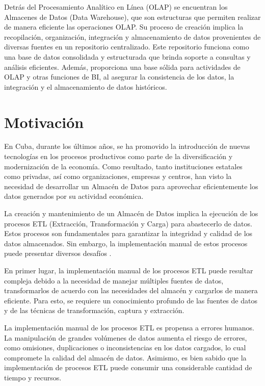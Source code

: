 Detrás del Procesamiento Analítico en Línea (OLAP) se encuentran los Almacenes de Datos (Data Warehouse), que son 
estructuras que permiten realizar de manera eficiente las operaciones OLAP. Su proceso de creaci\'on implica la 
recopilación, 
organización, integración y almacenamiento de datos provenientes de diversas fuentes en un repositorio centralizado. Este 
repositorio funciona como una base de datos consolidada y estructurada que brinda soporte a consultas y análisis eficientes. 
Además, proporciona una base sólida para actividades de OLAP y otras funciones de BI, al 
asegurar la consistencia de los datos, la integración y el almacenamiento de datos históricos.

\section{Motivaci\'on}

En Cuba, durante los \'ultimos años, se ha promovido la introducción de nuevas tecnologías en los procesos 
productivos como parte de la diversificación y modernización de la economía. Como resultado, tanto instituciones 
estatales como privadas, así como organizaciones, empresas y centros, han visto la necesidad de desarrollar un Almac\'en 
de Datos para aprovechar eficientemente los datos generados por su actividad económica.

La creación y mantenimiento de un Almacén de Datos implica la ejecución de los procesos ETL (Extracción, Transformación y 
Carga) para abastecerlo de datos. Estos procesos son fundamentales para garantizar la integridad y calidad de los datos 
almacenados. Sin embargo, la implementación manual de estos procesos puede presentar diversos desafíos
\cite{nwokeji2021systematic, dhaouadi2022data, kimball2004data}.

En primer lugar, la implementación manual de los procesos ETL puede resultar compleja debido a la necesidad 
de manejar múltiples fuentes de datos, transformarlos de acuerdo con las necesidades del almacén y cargarlos de manera 
eficiente. Para esto, se requiere un conocimiento profundo de las fuentes de datos y de las técnicas de 
transformación, captura y extracción.

La implementación manual de los procesos ETL es propensa a errores humanos. La manipulación de grandes 
volúmenes de datos aumenta el riesgo de errores, como omisiones, duplicaciones o inconsistencias en los datos cargados, lo 
cual compromete la calidad del almac\'en de datos. Asimismo, es bien sabido que la implementación de procesos ETL puede consumir una 
considerable cantidad de tiempo y recursos.

